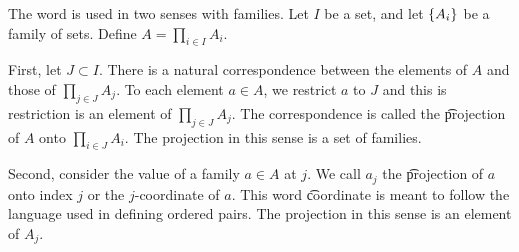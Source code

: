 
The word  is used in two senses with families.
Let $I$ be a set, and let $\{A_i\}$ be a family of sets.
Define $A = \prod_{i \in I} A_i$.

First, let $J \subset I$.
There is a natural correspondence between the elements of $A$ and those of $\prod_{j \in J} A_j$.
To each element $a \in A$, we restrict $a$ to $J$ and this is restriction is an element of $\prod_{j \in J} A_j$.
The correspondence is called the \t{projection} of $A$ onto $\prod_{i \in J} A_i$.
The projection in this sense is a set of families.

Second, consider the value of a family $a \in A$ at $j$.
We call $a_j$ the \t{projection of $a$ onto index $j$} or the \t{$j$-coordinate} of $a$.
This word \t{coordinate} is meant to follow the language used in defining ordered pairs.
The projection in this sense is an element of $A_j$.
